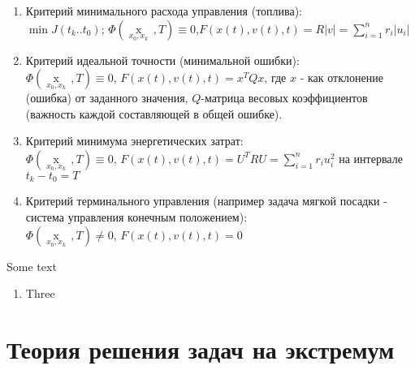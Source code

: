 \documentclass[preprint,russian,a5paper,10pt,twoside]{ncc}
\begin{document}
\begin{itemize}
\begin{enumerate}
\begin{itemize}
\end{itemize}
\item Критерий минимального расхода управления (топлива): 
\\\begin{math}\min J\left( {{t}_{k}}..{{t}_{0}} \right)\end{math}; $\Phi \left( \underset{{{x}_{0}},{{x}_{k}}}{\mathop{x\left( T \right)}}\,,T \right)\equiv 0$,$F\left( x\left( t \right),v\left( t \right),t \right)=R\left| v \right|=\sum\limits_{i=1}^{n}{{{r}_{i}}}\left| {{u}_{i}} \right|$
\item Критерий идеальной точности (минимальной ошибки):\\\begin{math}\Phi \left( \underset{{{x}_{0}},{{x}_{k}}}{\mathop{x\left( T \right)}}\,,T \right)\equiv 0\end{math}, \begin{math}F\left( x\left( t \right),v\left( t \right),t \right)={{x}^{T}}Qx\end{math}, где $x$ - как отклонение (ошибка) от заданного значения, $Q$-матрица весовых коэффициентов (важность каждой составляющей в общей ошибке).
\item Критерий минимума энергетических затрат:\\\begin{math}\Phi \left( \underset{{{x}_{0}},{{x}_{k}}}{\mathop{x\left( T \right)}}\,,T \right)\equiv 0\end{math}, \begin{math}F\left( x\left( t \right),v\left( t \right),t \right)={{U}^{T}}RU=\sum\limits_{i=1}^{n}{{{r}_{i}}}u_{i}^{2}\end{math} на интервале ${{t}_{k}}-{{t}_{0}}=T$
\item Критерий терминального управления (например задача мягкой посадки - система управления конечным положением):\\
$\Phi \left( \underset{{{x}_{0}},{{x}_{k}}}{\mathop{x\left( T \right)}}\,,T \right)\ne 0$, $F\left( x\left( t \right),v\left( t \right),t \right)=0$
\end{enumerate}
Some text
\begin{enumerate}[resume]
  \item Three
\end{enumerate}

\end{itemize}

\par

\clearpage
\section{Теория решения задач на экстремум\label{extremum}}
\end{document}
